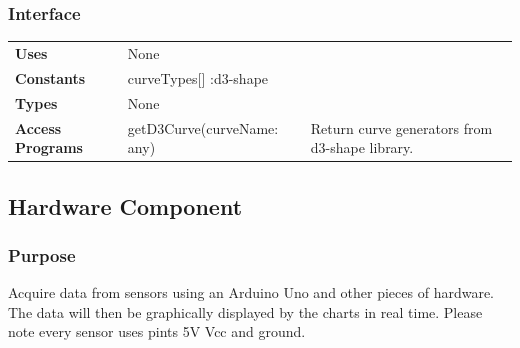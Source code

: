 \documentclass[12pt, titlepage]{article}
\begin{document}
\subsubsection{Interface}
\begin{table}[H]
\begin{tabular}{l p{5cm}p{5cm}}
\textbf{Uses}            & None                     &                                                                                                                  \\
\textbf{Constants}       & curveTypes[] :d3-shape                            &                                                                                                     \\
                         
\textbf{Types}           & None                                       &                                                                                                                  \\
\textbf{Access Programs} & getD3Curve(curveName: any) & Return curve generators from d3-shape library.                                                                                             \\
\end{tabular}
\end{table}

\newpage
\subsection{Hardware Component} 
\subsubsection{Purpose}
Acquire data from sensors using an Arduino Uno and other pieces of hardware. The data will then be graphically displayed by the charts in real time. Please note every sensor uses pints 5V Vcc and ground.
\end{document}
